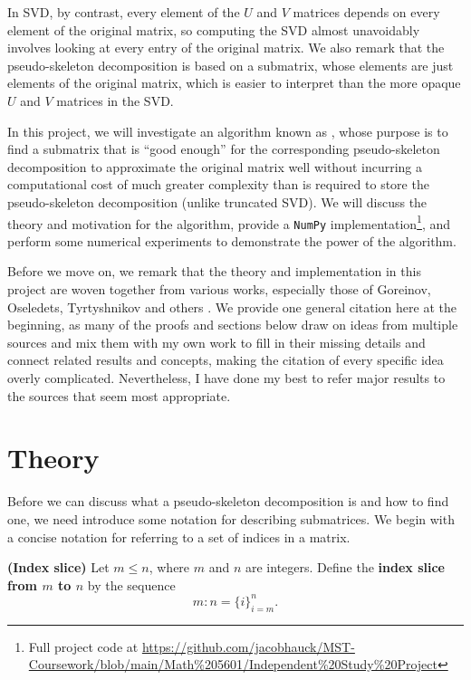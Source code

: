 \documentclass{article}
\begin{document}
	In SVD, by contrast, every element of the $U$ and $V$ matrices depends on every element of the original matrix, so computing the SVD almost unavoidably involves looking at every entry of the original matrix. We also remark that the pseudo-skeleton decomposition is based on a submatrix, whose elements are just elements of the original matrix, which is easier to interpret than the more opaque $U$ and $V$ matrices in the SVD.
	
	In this project, we will investigate an algorithm known as \maxvol{} \cite{goreinov_2010}, whose purpose is to find a submatrix that is ``good enough'' for the corresponding pseudo-skeleton decomposition to approximate the original matrix well without incurring a computational cost of much greater complexity than is required to store the pseudo-skeleton decomposition (unlike truncated SVD). We will discuss the theory and motivation for the algorithm, provide a \texttt{NumPy} implementation\footnote{Full project code at \href{https://github.com/jacobhauck/MST-Coursework/blob/main/Math\%205601/Independent\%20Study\%20Project}{https://github.com/jacobhauck/MST-Coursework/blob/main/Math\%205601/Independent\%20Study\%20Project}}, and perform some numerical experiments to demonstrate the power of the algorithm.
	
	Before we move on, we remark that the theory and implementation in this project are woven together from various works, especially those of Goreinov, Oseledets, Tyrtyshnikov and others \cite{goreinov_1997, goreinov_2010, oseledets_2010a, olshevsky_2001, oseledets_2009, hamm_2022}. We provide one general citation here at the beginning, as many of the proofs and sections below draw on ideas from multiple sources and mix them with my own work to fill in their missing details and connect related results and concepts, making the citation of every specific idea overly complicated. Nevertheless, I have done my best to refer major results to the sources that seem most appropriate.
	
	\section{Theory}
	
	Before we can discuss what a pseudo-skeleton decomposition is and how to find one, we need introduce some notation for describing submatrices. We begin with a concise notation for referring to a set of indices in a matrix.
	
	\begin{dfn} \textnormal{\bf(Index slice)}
		\label{def:index_slice}
		Let $m \le n$, where $m$ and $n$ are integers. Define the \textbf{index slice from $m$ to $n$} by the sequence
		\begin{equation}
			m: n = \{i\}_{i=m}^n.
		\end{equation}
	\end{dfn}
	
\end{document}
